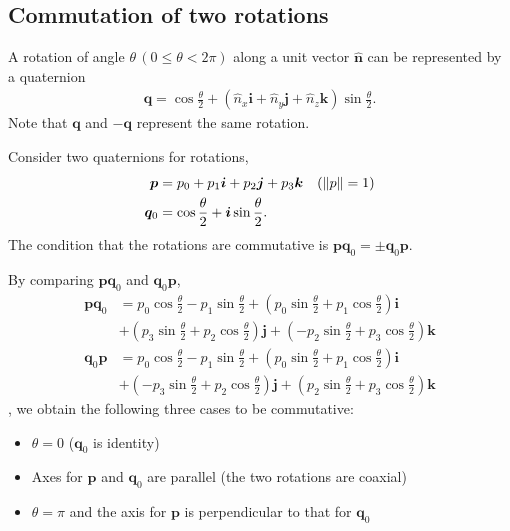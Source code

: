 \subsection{Commutation of two rotations}

A rotation of angle $\theta \, (0 \leq \theta < 2 \pi)$ along a unit vector $\hat{\bm{n}}$ can be represented by a quaternion
\begin{align}
    \bm{q} = \cos \frac{\theta}{2} + (\hat{n}_{x} \bm{i} + \hat{n}_{y} \bm{j} + \hat{n}_{z} \bm{k}) \sin \frac{\theta}{2}.
\end{align}
Note that $\bm{q}$ and $-\bm{q}$ represent the same rotation.

Consider two quaternions for rotations,
\begin{align}
    \bm{p} &= p_{0} + p_{1} \bm{i} + p_{2} \bm{j} + p_{3} \bm{k} \quad (\left\lVert p\right\rVert = 1) \\
    \bm{q}_{0} &= \cos \frac{\theta}{2} + \bm{i} \sin \frac{\theta}{2}.
\end{align}
The condition that the rotations are commutative is $\bm{p}\bm{q}_{0} = \pm \bm{q}_{0} \bm{p}$.

By comparing $\bm{p}\bm{q}_{0}$ and $\bm{q}_{0} \bm{p}$,
\begin{align}
    \bm{p}\bm{q}_{0} &= p_{0} \cos \frac{\theta}{2} - p_{1} \sin \frac{\theta}{2}
                        + \left( p_{0} \sin \frac{\theta}{2} + p_{1} \cos \frac{\theta}{2} \right) \bm{i} \nonumber \\
                        &+ \left( p_{3} \sin \frac{\theta}{2} + p_{2} \cos \frac{\theta}{2} \right) \bm{j}
                        + \left( -p_{2} \sin \frac{\theta}{2} + p_{3} \cos \frac{\theta}{2} \right) \bm{k} \\
    \bm{q}_{0}\bm{p} &= p_{0} \cos \frac{\theta}{2} - p_{1} \sin \frac{\theta}{2}
                        + \left( p_{0} \sin \frac{\theta}{2} + p_{1} \cos \frac{\theta}{2} \right) \bm{i} \nonumber \\
                        &+ \left( -p_{3} \sin \frac{\theta}{2} + p_{2} \cos \frac{\theta}{2} \right) \bm{j}
                        + \left( p_{2} \sin \frac{\theta}{2} + p_{3} \cos \frac{\theta}{2} \right) \bm{k}
\end{align},
we obtain the following three cases to be commutative:
\begin{itemize}
    \item $\theta = 0$ ($\bm{q}_{0}$ is identity)
    \item Axes for $\bm{p}$ and $\bm{q}_{0}$ are parallel (the two rotations are coaxial)
    \item $\theta = \pi$ and the axis for $\bm{p}$ is perpendicular to that for $\bm{q}_{0}$
\end{itemize}

